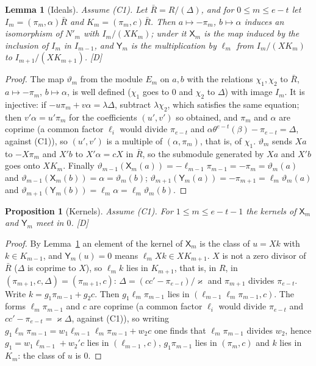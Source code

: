 \documentclass[11pt]{article}
\newtheorem{proposition}{Proposition}
\newtheorem{lemma}{Lemma}
\theoremstyle{definition}
\theoremstyle{remark}
\begin{document}
\begin{lemma}[Ideals]\label{lem:exptideals}
Assume (C1). Let $\bar R=R/(\Delta)$, and for $0\le m\le e-t$ let $I_m=(\pi_m,\alpha)\bar R$ and $K_m=(\pi_m,c)\bar R$. Then $a\mapsto-\pi_m$, $b\mapsto\alpha$ induces an isomorphism of $N'_m$ with $I_m/(XK_m)$; under it $\mathsf X_m$ is the map induced by the inclusion of $I_m$ in $I_{m-1}$, and $\mathsf Y_m$ is the multiplication by $\ell_m$ from $I_m/(XK_m)$ to $I_{m+1}/(XK_{m+1})$. [D]
\end{lemma}
\begin{proof}
The map $\vartheta_m$ from the module $E_m$ on $a,b$ with the relations $\chi_1,\chi_2$ to $\bar R$, $a\mapsto-\pi_m$, $b\mapsto\alpha$, is well defined ($\chi_1$ goes to $0$ and $\chi_2$ to $\Delta$) with image $I_m$. It is injective: if $-u\pi_m+v\alpha=\lambda\Delta$, subtract $\lambda\chi_2$, which satisfies the same equation; then $v'\alpha=u'\pi_m$ for the coefficients $(u',v')$ so obtained, and $\pi_m$ and $\alpha$ are coprime (a common factor $\ell_i$ would divide $\pi_{e-t}$ and $\alpha\theta^{e-t}(\beta)-\pi_{e-t}=\Delta$, against (C1)), so $(u',v')$ is a multiple of $(\alpha,\pi_m)$, that is, of $\chi_1$. $\vartheta_m$ sends $Xa$ to $-X\pi_m$ and $X'b$ to $X'\alpha=cX$ in $\bar R$, so the submodule generated by $Xa$ and $X'b$ goes onto $XK_m$. Finally $\vartheta_{m-1}(\mathsf X_m(a))=-\ell_{m-1}\pi_{m-1}=-\pi_m=\vartheta_m(a)$ and $\vartheta_{m-1}(\mathsf X_m(b))=\alpha=\vartheta_m(b)$; $\vartheta_{m+1}(\mathsf Y_m(a))=-\pi_{m+1}=\ell_m\vartheta_m(a)$ and $\vartheta_{m+1}(\mathsf Y_m(b))=\ell_m\alpha=\ell_m\vartheta_m(b)$.
\end{proof}

\begin{proposition}[Kernels]\label{prop:exptkernels}
Assume (C1). For $1\le m\le e-t-1$ the kernels of $\mathsf X_m$ and $\mathsf Y_m$ meet in $0$. [D]
\end{proposition}
\begin{proof}
By Lemma~\ref{lem:exptideals} an element of the kernel of $\mathsf X_m$ is the class of $u=Xk$ with $k\in K_{m-1}$, and $\mathsf Y_m(u)=0$ means $\ell_mXk\in XK_{m+1}$. $X$ is not a zero divisor of $\bar R$ ($\Delta$ is coprime to $X$), so $\ell_mk$ lies in $K_{m+1}$, that is, in $R$, in $(\pi_{m+1},c,\Delta)=(\pi_{m+1},c)$: $\Delta=(cc'-\pi_{e-t})/\varkappa$ and $\pi_{m+1}$ divides $\pi_{e-t}$. Write $k=g_1\pi_{m-1}+g_2c$. Then $g_1\ell_m\pi_{m-1}$ lies in $(\ell_{m-1}\ell_m\pi_{m-1},c)$. The forms $\ell_m\pi_{m-1}$ and $c$ are coprime (a common factor $\ell_i$ would divide $\pi_{e-t}$ and $cc'-\pi_{e-t}=\varkappa\Delta$, against (C1)), so writing $g_1\ell_m\pi_{m-1}=w_1\ell_{m-1}\ell_m\pi_{m-1}+w_2c$ one finds that $\ell_m\pi_{m-1}$ divides $w_2$, hence $g_1=w_1\ell_{m-1}+w_2'c$ lies in $(\ell_{m-1},c)$, $g_1\pi_{m-1}$ lies in $(\pi_m,c)$ and $k$ lies in $K_m$: the class of $u$ is $0$.
\end{proof}
\end{document}
